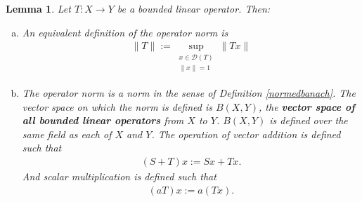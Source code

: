 \documentclass[11pt]{article}
\theoremstyle{mystyle}
\newtheorem{lm}{Lemma}[section]
\newcommand{\0}{\mathbf{0}}
\begin{document}
\begin{lm}\label{operatornormisnorm}
Let $T: X \longrightarrow Y$ be a bounded linear operator. Then:
\begin{enumerate}[(a)]
    \item An equivalent definition of the operator norm is
    \begin{align*}
        \|T\| := \sup_{\substack{x \in \mathscr{D}(T)\\ \|x\| = 1}} \|Tx\|
    \end{align*}
    
    \item The operator norm is a norm in the sense of Definition \ref{normedbanach}. The vector space on which the norm is defined is $B(X, Y)$, the \textbf{vector space of all bounded linear operators} from $X$ to $Y$. $B(X, Y)$ is defined over the same field as each of $X$ and $Y$. The operation of vector addition is defined such that
    \begin{align*}
        (S + T)x := Sx + Tx.
    \end{align*}
    And scalar multiplication is defined such that
    \begin{align*}
        (aT)x := a(Tx).
    \end{align*}
\end{enumerate}
\end{lm}
\end{document}
